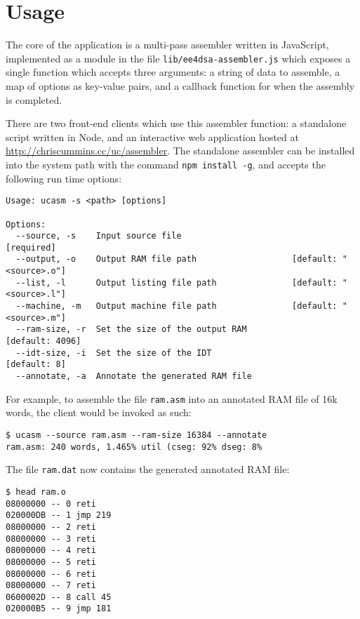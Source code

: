 \documentclass[12pt,twoside]{report}
\begin{document}
\newpage
\section{Usage}

The core of the application is a multi-pass assembler written in
JavaScript, implemented as a module in the file
\texttt{lib/ee4dsa-assembler.js} which exposes a single function which
accepts three arguments: a string of data to assemble, a map of
options as key-value pairs, and a callback function for when the
assembly is completed.

There are two front-end clients which use this assembler function: a
standalone script written in Node, and an interactive web application
hosted at \url{http://chriscummins.cc/uc/assembler}. The standalone
assembler can be installed into the system path with the command
\texttt{npm install -g}, and accepts the following run time options:

\begin{verbatim}
Usage: ucasm -s <path> [options]

Options:
  --source, -s    Input source file                                   [required]
  --output, -o    Output RAM file path                   [default: "<source>.o"]
  --list, -l      Output listing file path               [default: "<source>.l"]
  --machine, -m   Output machine file path               [default: "<source>.m"]
  --ram-size, -r  Set the size of the output RAM                 [default: 4096]
  --idt-size, -i  Set the size of the IDT                           [default: 8]
  --annotate, -a  Annotate the generated RAM file
\end{verbatim}

For example, to assemble the file \texttt{ram.asm} into an annotated
RAM file of 16k words, the client would be invoked as such:

\begin{verbatim}
$ ucasm --source ram.asm --ram-size 16384 --annotate
ram.asm: 240 words, 1.465% util (cseg: 92% dseg: 8%
\end{verbatim}

The file \texttt{ram.dat} now contains the generated annotated RAM
file:

\begin{verbatim}
$ head ram.o
08000000 -- 0 reti
020000DB -- 1 jmp 219
08000000 -- 2 reti
08000000 -- 3 reti
08000000 -- 4 reti
08000000 -- 5 reti
08000000 -- 6 reti
08000000 -- 7 reti
0600002D -- 8 call 45
020000B5 -- 9 jmp 181
\end{verbatim}
\end{document}
